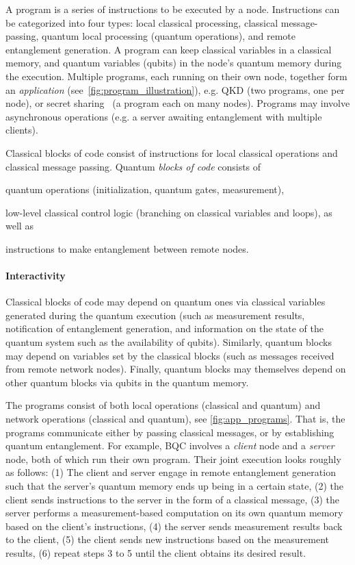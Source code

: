A program is a series of instructions to be executed by a node.
Instructions can be categorized into four types: local classical processing, classical message-passing, quantum local processing (quantum operations), and remote entanglement generation.
A program can keep classical variables in a classical memory, and quantum variables (qubits) in the node's quantum memory during the execution.
Multiple programs, each running on their own node, together form an \textit{application} (see~\ref{fig:program_illustration}), e.g. QKD (two programs, one per node),
or secret sharing~\cite{hillery1999quantum} (a program each on many nodes).
Programs may involve asynchronous operations (e.g. a server awaiting entanglement with multiple clients).


Classical blocks of code consist of instructions for local classical operations and classical message passing. Quantum \emph{blocks of code} consists of
%
\begin{inlinelist}
\item quantum operations (initialization, quantum gates, measurement), 
\item low-level classical control logic (branching on classical variables and loops), as well as 
\item instructions to make entanglement between remote nodes. 
\end{inlinelist}
%

\paragraph{Interactivity}
Classical blocks of code may depend on quantum ones via classical variables generated during the quantum execution (such as measurement results, notification of entanglement generation, and information on the state of the quantum system such as the availability of qubits).
Similarly, quantum blocks may depend on variables set by the classical blocks (such as messages received from remote network nodes).
Finally, quantum blocks may themselves depend on other quantum blocks via qubits in the quantum memory. 

The programs consist of both local operations (classical and quantum) and network operations (classical and quantum), see \cref{fig:app_programs}.
That is, the programs communicate either by passing classical messages, or by establishing quantum entanglement.
For example, BQC involves a \textit{client} node and a \textit{server} node, both of which run their own program.
Their joint execution looks roughly as follows:
    (1) The client and server engage in remote entanglement generation such that the server's quantum memory ends up being in a certain state,
    (2) the client sends instructions to the server in the form of a classical message,
    (3) the server performs a measurement-based computation on its own quantum memory based on the client's instructions,
    (4) the server sends measurement results back to the client,
    (5) the client sends new instructions based on the measurement results,
    (6) repeat steps 3 to 5 until the client obtains its desired result.

